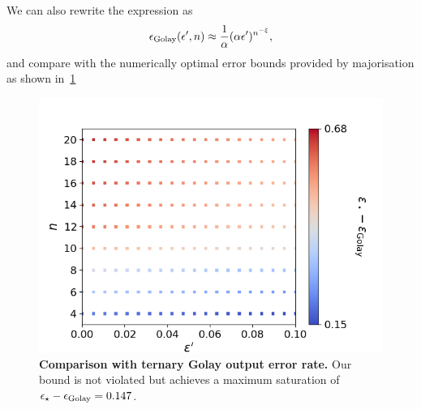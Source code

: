 \documentclass[pra,
aps,
twocolumn,
superscriptaddress,
groupedaddress,
nofootinbib,
reprint
]{revtex4-1}
\begin{document}
We can also rewrite the expression as 
\begin{equation}
	\epsilon_{\rm{Golay}}(\epsilon', n) \approx \frac{1}{\alpha}(\alpha\epsilon')^{n^{-\xi}},
\end{equation}
and compare with the numerically optimal error bounds provided by majorisation as shown in~\cref{fig:prakash_compare_errors}
\begin{figure}[h]
    \centering
    \includegraphics[scale=0.5]{figs/prakash_compare_errors.png}
    \caption{\textbf{Comparison with ternary Golay output error rate.}
    Our bound is not violated but achieves a maximum saturation of $\epsilon_\star - \epsilon_{\rm{Golay}} = 0.147$.
    }
    \label{fig:prakash_compare_errors}
\end{figure}
\end{document}
